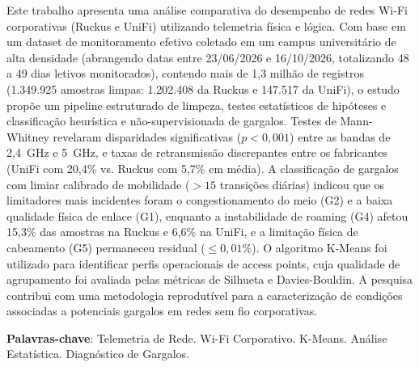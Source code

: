 \setlength{\absparsep}{18pt} %

\begin{resumo}
  Este trabalho apresenta uma análise comparativa do desempenho de redes Wi-Fi corporativas (Ruckus e UniFi) utilizando telemetria física e lógica. Com base em um dataset de monitoramento efetivo coletado em um campus universitário de alta densidade (abrangendo datas entre 23/06/2026 e 16/10/2026, totalizando 48 a 49 dias letivos monitorados), contendo mais de 1,3 milhão de registros (1.349.925 amostras limpas: 1.202.408 da Ruckus e 147.517 da UniFi), o estudo propõe um pipeline estruturado de limpeza, testes estatísticos de hipóteses e classificação heurística e não-supervisionada de gargalos. Testes de Mann-Whitney revelaram disparidades significativas ($p < 0,001$) entre as bandas de 2,4~GHz e 5~GHz, e taxas de retransmissão discrepantes entre os fabricantes (UniFi com 20,4\% vs. Ruckus com 5,7\% em média). A classificação de gargalos com limiar calibrado de mobilidade ($> 15$ transições diárias) indicou que os limitadores mais incidentes foram o congestionamento do meio (G2) e a baixa qualidade física de enlace (G1), enquanto a instabilidade de roaming (G4) afetou 15,3\% das amostras na Ruckus e 6,6\% na UniFi, e a limitação física de cabeamento (G5) permaneceu residual ($\le 0,01\%$). O algoritmo K-Means foi utilizado para identificar perfis operacionais de access points, cuja qualidade de agrupamento foi avaliada pelas métricas de Silhueta e Davies-Bouldin. A pesquisa contribui com uma metodologia reprodutível para a caracterização de condições associadas a potenciais gargalos em redes sem fio corporativas.

 \textbf{Palavras-chave}: Telemetria de Rede. Wi-Fi Corporativo. K-Means. Análise Estatística. Diagnóstico de Gargalos.
\end{resumo}
